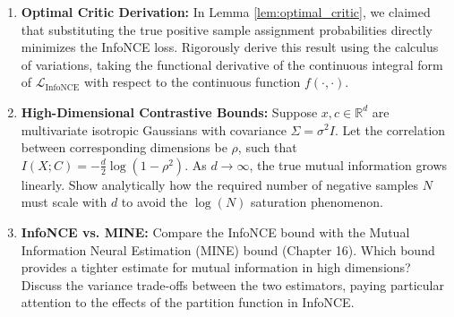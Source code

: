 \begin{enumerate}
    \item \textbf{Optimal Critic Derivation:} In Lemma \ref{lem:optimal_critic}, we claimed that substituting the true positive sample assignment probabilities directly minimizes the InfoNCE loss. Rigorously derive this result using the calculus of variations, taking the functional derivative of the continuous integral form of $\mathcal{L}_{\text{InfoNCE}}$ with respect to the continuous function $f(\cdot, \cdot)$.
    \item \textbf{High-Dimensional Contrastive Bounds:} Suppose $x, c \in \mathbb{R}^d$ are multivariate isotropic Gaussians with covariance $\Sigma = \sigma^2 I$. Let the correlation between corresponding dimensions be $\rho$, such that $I(X; C) = -\frac{d}{2} \log(1 - \rho^2)$. As $d \to \infty$, the true mutual information grows linearly. Show analytically how the required number of negative samples $N$ must scale with $d$ to avoid the $\log(N)$ saturation phenomenon.
    \item \textbf{InfoNCE vs. MINE:} Compare the InfoNCE bound with the Mutual Information Neural Estimation (MINE) bound (Chapter 16). Which bound provides a tighter estimate for mutual information in high dimensions? Discuss the variance trade-offs between the two estimators, paying particular attention to the effects of the partition function in InfoNCE.
\end{enumerate}

